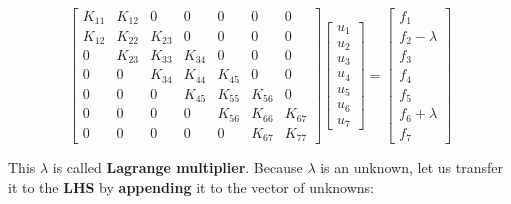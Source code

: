 \documentclass[10pt,b5paper,titlepage]{book}
\begin{document}
\begin{equation}\label{master-stiffness-6-bar-lagrange}
    \begin{bmatrix}
        K_{11} & K_{12} & 0 & 0 & 0 & 0 & 0 \\
        K_{12} & K_{22} & K_{23} & 0 & 0 & 0 & 0 \\
        0 & K_{23} & K_{33} & K_{34} & 0 & 0 & 0 \\
        0 & 0 & K_{34} & K_{44} & K_{45} & 0 & 0 \\
        0 & 0 & 0 & K_{45} & K_{55} & K_{56} & 0 \\
        0 & 0 & 0 & 0 & K_{56} & K_{66} & K_{67} \\
        0 & 0 & 0 & 0 & 0 & K_{67} & K_{77}
    \end{bmatrix}
    \begin{bmatrix}
        u_1 \\
        u_2 \\
        u_3 \\
        u_4 \\
        u_5 \\
        u_6 \\
        u_7
    \end{bmatrix}
    = \begin{bmatrix}
        f_1 \\
        f_2 - \lambda \\
        f_3 \\
        f_4 \\
        f_5 \\
        f_6 + \lambda \\
        f_7
    \end{bmatrix}
\end{equation}

This $ \lambda $ is called \textbf{Lagrange multiplier}. Because $ \lambda $
is an unknown, let us transfer it to the \textbf{LHS} by \textbf{appending} it
to the vector of unknowns:
\end{document}
